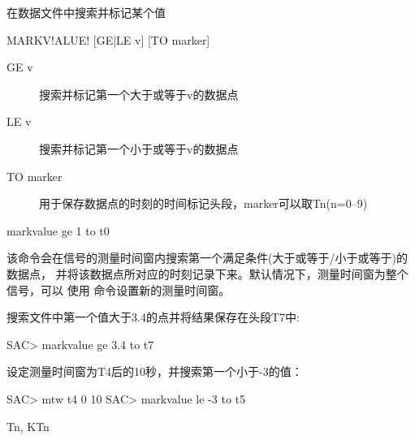 \label{cmd:markvalue}

在数据文件中搜索并标记某个值

\begin{SACSTX}
MARKV!ALUE! [GE|LE v] [TO marker]
\end{SACSTX}

\begin{description}
\item [GE v] 搜索并标记第一个大于或等于v的数据点
\item [LE v] 搜索并标记第一个小于或等于v的数据点
\item [TO marker] 用于保存数据点的时刻的时间标记头段，marker可以取Tn(n=0--9)
\end{description}

\begin{SACDFT}
markvalue ge 1 to t0
\end{SACDFT}

该命令会在信号的测量时间窗内搜索第一个满足条件(大于或等于/小于或等于)的数据点，
并将该数据点所对应的时刻记录下来。默认情况下，测量时间窗为整个信号，可以
使用  命令设置新的测量时间窗。

搜索文件中第一个值大于3.4的点并将结果保存在头段T7中:
\begin{SACCode}
SAC> markvalue ge 3.4 to t7
\end{SACCode}

设定测量时间窗为T4后的10秒，并搜索第一个小于-3的值：
\begin{SACCode}
SAC> mtw t4 0 10
SAC> markvalue le -3 to t5
\end{SACCode}

Tn, KTn

